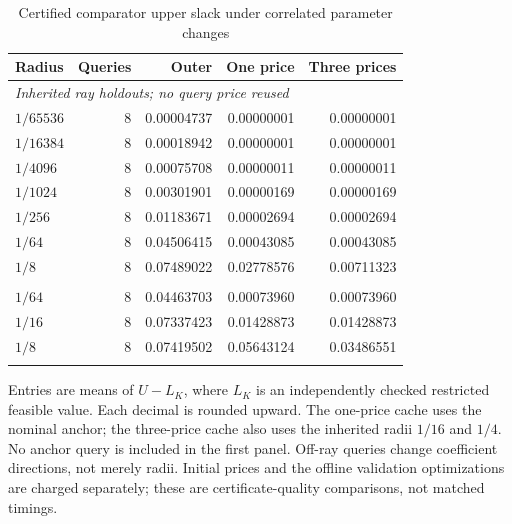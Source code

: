 \begin{table}[htbp]
\centering
\caption{Certified comparator upper slack under correlated parameter changes}
\label{tab:r27-cache}
\begin{tabular}{lrrrr}
\toprule
Radius & Queries & Outer & One price & Three prices\\
\midrule
\multicolumn{5}{l}{\textit{Inherited ray holdouts; no query price reused}}\\
$1/65536$ & 8 & 0.00004737 & 0.00000001 & 0.00000001 \\
$1/16384$ & 8 & 0.00018942 & 0.00000001 & 0.00000001 \\
$1/4096$ & 8 & 0.00075708 & 0.00000011 & 0.00000011 \\
$1/1024$ & 8 & 0.00301901 & 0.00000169 & 0.00000169 \\
$1/256$ & 8 & 0.01183671 & 0.00002694 & 0.00002694 \\
$1/64$ & 8 & 0.04506415 & 0.00043085 & 0.00043085 \\
$1/8$ & 8 & 0.07489022 & 0.02778576 & 0.00711323 \\
\addlinespace
\multicolumn{5}{l}{\textit{New off-ray queries; same frozen cache}}\\
$1/64$ & 8 & 0.04463703 & 0.00073960 & 0.00073960 \\
$1/16$ & 8 & 0.07337423 & 0.01428873 & 0.01428873 \\
$1/8$ & 8 & 0.07419502 & 0.05643124 & 0.03486551 \\
\addlinespace
\bottomrule
\end{tabular}
\par\smallskip
\begin{minipage}{\textwidth}
Entries are means of $U-L_K$, where $L_K$ is an independently checked restricted feasible value. Each decimal is rounded upward. The one-price cache uses the nominal anchor; the three-price cache also uses the inherited radii $1/16$ and $1/4$. No anchor query is included in the first panel. Off-ray queries change coefficient directions, not merely radii. Initial prices and the offline validation optimizations are charged separately; these are certificate-quality comparisons, not matched timings.
\end{minipage}
\end{table}
